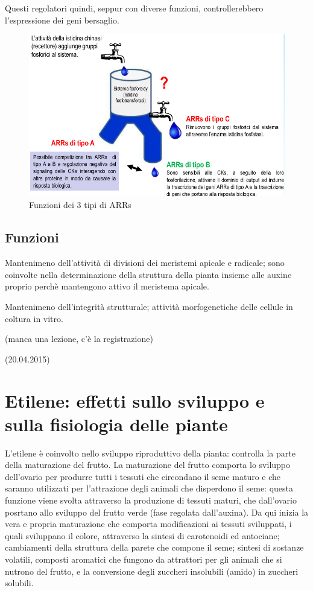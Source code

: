 \documentclass[a4paper,12pt]{book}
\begin{document}
Questi regolatori quindi, seppur con diverse funzioni, controllerebbero l'espressione dei geni bersaglio.
\begin{figure}[H]
\centering
\includegraphics[scale=0.4]{immagini/ARR.jpg}
\caption{Funzioni dei 3 tipi di ARRs}
\end{figure}

\section{Funzioni}
Mantenimeno dell'attività di divisioni dei meristemi apicale e radicale; sono coinvolte nella determinazione della struttura della pianta insieme alle auxine proprio perchè mantengono attivo il meristema apicale. 

Mantenimeno dell'integrità strutturale; attività morfogenetiche delle cellule in coltura in vitro.

(manca una lezione, c'è la registrazione)

(20.04.2015)
\chapter{Etilene: effetti sullo sviluppo e sulla fisiologia delle piante}
L'etilene è coinvolto nello sviluppo riproduttivo della pianta: controlla la parte della maturazione del frutto. La maturazione del frutto comporta lo sviluppo dell'ovario per produrre tutti i tessuti che circondano il seme maturo e che saranno utilizzati per l'attrazione degli animali che disperdono il seme: questa funzione viene svolta attraverso la produzione di tessuti maturi, che dall'ovario posrtano allo sviluppo del frutto verde (fase regolata dall'auxina). Da qui inizia la vera e propria maturazione che comporta modificazioni ai tessuti sviluppati, i quali sviluppano il colore, attraverso la sintesi di carotenoidi ed antociane; cambiamenti della struttura della parete che compone il seme; sintesi di sostanze volatili, composti aromatici che fungono da attrattori per gli animali che si nutrono del frutto, e la conversione degli zuccheri insolubili (amido) in zuccheri solubili.
\end{document}
